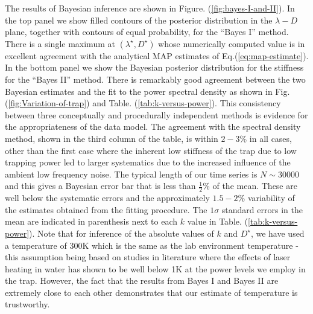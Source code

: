 \documentclass[english,aps, onecolumn, prl,superscriptaddress, notitlepage]{revtex4-1}
\begin{document}
The results of Bayesian inference are shown in Figure. (\ref{fig:bayes-I-and-II}).
In the top panel we show filled contours of the posterior distribution
in the $\lambda-D$ plane, together with contours of equal probability,
for the ``Bayes I'' method. There is a single maximum at $(\lambda^{\star},D^{\star})$
whose numerically computed value is in excellent agreement with the
analytical MAP estimates of Eq.(\ref{eq:map-estimate}). In the bottom
panel we show the Bayesian posterior distribution for the stiffness
for the ``Bayes II'' method. There is remarkably good agreement
between the two Bayesian estimates and the fit to the power spectral
density as shown in Fig. (\ref{fig:Variation-of-trap}) and Table.
(\ref{tab:k-versus-power}). This consistency between three conceptually
and procedurally independent methods is evidence for the appropriateness
of the data model. The agreement with the spectral density method,
shown in the third column of the table, is within $2-3\%$ in all
cases, other than the first case where the inherent low stiffness
of the trap due to low trapping power led to larger systematics due
to the increased influence of the ambient low frequency noise. The
typical length of our time series is $N\sim30000$ and this gives
a Bayesian error bar that is less than $\frac{1}{2}$\% of the mean.
These are well below the systematic errors and the approximately $1.5-2\%$
variability of the estimates obtained from the fitting procedure.
The $1\sigma$ standard errors in the mean are indicated in parenthesis
next to each $k$ value in Table. (\ref{tab:k-versus-power}). Note
that for inference of the absolute values of $k$ and $D^{\star}$,
we have used a temperature of 300K which is the same as the lab
environment temperature - this assumption being based on studies in
literature \cite{schmidt03heating}where the effects of laser heating
in water has shown to be well below 1K at the power levels we employ
in the trap. However, the fact that the results from Bayes I and Bayes
II are extremely close to each other demonstrates that our estimate
of temperature is trustworthy.
\end{document}
